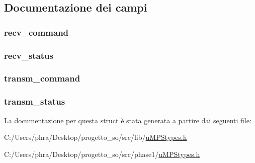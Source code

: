 \subsection{Documentazione dei campi}
\hypertarget{structtermreg__t_aaee0ee8a649c4a4792f3ee83350db6ea}{
\subsubsection[{recv\-\_\-command}]{ recv\-\_\-command}}\label{structtermreg__t_aaee0ee8a649c4a4792f3ee83350db6ea}
\hypertarget{structtermreg__t_adb515c26e4c6508ab1a44cc43a8a91ae}{
\subsubsection[{recv\-\_\-status}]{ recv\-\_\-status}}\label{structtermreg__t_adb515c26e4c6508ab1a44cc43a8a91ae}
\hypertarget{structtermreg__t_a2b198d43d6df5503425e365297cd5444}{
\subsubsection[{transm\-\_\-command}]{ transm\-\_\-command}}\label{structtermreg__t_a2b198d43d6df5503425e365297cd5444}
\hypertarget{structtermreg__t_ab3957b0f10a0e492e4e29b90167f513d}{
\subsubsection[{transm\-\_\-status}]{ transm\-\_\-status}}\label{structtermreg__t_ab3957b0f10a0e492e4e29b90167f513d}


La documentazione per questa struct è stata generata a partire dai seguenti file\-:\begin{DoxyCompactItemize}
\item 
C\-:/\-Users/phra/\-Desktop/progetto\-\_\-so/src/lib/\hyperlink{lib_2u_m_p_stypes_8h}{u\-M\-P\-Stypes.\-h}\item 
C\-:/\-Users/phra/\-Desktop/progetto\-\_\-so/src/phase1/\hyperlink{phase1_2u_m_p_stypes_8h}{u\-M\-P\-Stypes.\-h}\end{DoxyCompactItemize}
